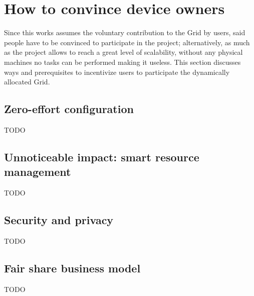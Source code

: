 \section{How to convince device owners}
Since this works assumes the voluntary contribution to the Grid by users, said people have to be convinced to participate in the project; alternatively, as much as the project allows to reach a great level of scalability, without any physical machines no tasks can be performed making it useless. This section discusses ways and prerequisites to incentivize users to participate the dynamically allocated Grid.

\subsection{Zero-effort configuration}
TODO

\subsection{Unnoticeable impact: smart resource management}
TODO

\subsection{Security and privacy}
TODO

\subsection{Fair share business model}
TODO
